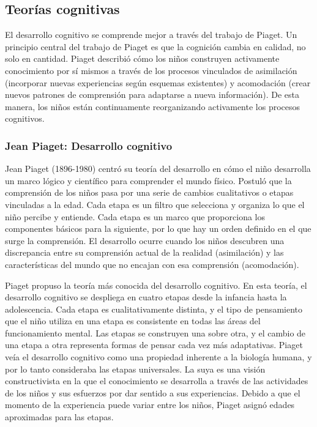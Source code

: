 \documentclass[11pt,letterpaper]{report}
\begin{document}
\subsection{Teorías cognitivas}
El desarrollo cognitivo se comprende mejor a través del trabajo de Piaget. Un
principio central del trabajo de Piaget es que la cognición cambia en calidad,
no solo en cantidad. Piaget describió cómo los niños construyen activamente
conocimiento por sí mismos a través de los procesos vinculados de asimilación
(incorporar nuevas experiencias según esquemas existentes) y acomodación (crear
nuevos patrones de comprensión para adaptarse a nueva información). De esta
manera, los niños están continuamente reorganizando activamente los procesos
cognitivos. \cite{Nelson19}

\subsubsection{Jean Piaget: Desarrollo cognitivo}
Jean Piaget (1896-1980) centró su teoría del desarrollo en cómo el niño
desarrolla un marco lógico y científico para comprender el mundo físico.
Postuló que la comprensión de los niños pasa por una serie de cambios
cualitativos o etapas vinculadas a la edad. Cada etapa es un filtro que
selecciona y organiza lo que el niño percibe y entiende. Cada etapa es un marco
que proporciona los componentes básicos para la siguiente, por lo que hay un
orden definido en el que surge la comprensión. El desarrollo ocurre cuando los
niños descubren una discrepancia entre su comprensión actual de la realidad
(asimilación) y las características del mundo que no encajan con esa
comprensión (acomodación). \cite{Feldman3}

Piaget propuso la teoría más conocida del desarrollo cognitivo. En esta teoría,
el desarrollo cognitivo se despliega en cuatro etapas desde la infancia hasta
la adolescencia. Cada etapa es cualitativamente distinta, y el tipo de
pensamiento que el niño utiliza en una etapa es consistente en todas las áreas
del funcionamiento mental. Las etapas se construyen una sobre otra, y el cambio
de una etapa a otra representa formas de pensar cada vez más adaptativas.
Piaget veía el desarrollo cognitivo como una propiedad inherente a la biología
humana, y por lo tanto consideraba las etapas universales. La suya es una
visión constructivista en la que el conocimiento se desarrolla a través de las
actividades de los niños y sus esfuerzos por dar sentido a sus experiencias.
Debido a que el momento de la experiencia puede variar entre los niños, Piaget
asignó edades aproximadas para las etapas. \cite{Gauvain2022}
\end{document}
